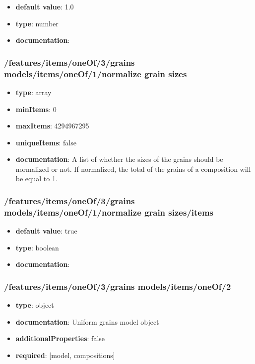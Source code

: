 \begin{itemize}\item {\bf default value}: 1.0
\item {\bf type}: number
\item {\bf documentation}: 
\end{itemize}\subsubsection{/features/items/oneOf/3/grains models/items/oneOf/1/normalize grain sizes}
\begin{itemize}\item {\bf type}: array
\item {\bf minItems}: 0
\item {\bf maxItems}: 4294967295
\item {\bf uniqueItems}: false
\item {\bf documentation}: A list of whether the sizes of the grains should be normalized or not. If normalized, the total of the grains of a composition will be equal to 1.
\end{itemize}\subsubsection{/features/items/oneOf/3/grains models/items/oneOf/1/normalize grain sizes/items}
\begin{itemize}\item {\bf default value}: true
\item {\bf type}: boolean
\item {\bf documentation}: 
\end{itemize}\subsubsection{/features/items/oneOf/3/grains models/items/oneOf/2}
\begin{itemize}\item {\bf type}: object
\item {\bf documentation}: Uniform grains model object
\item {\bf additionalProperties}: false
\item {\bf required}: [model, compositions]\end{itemize}
